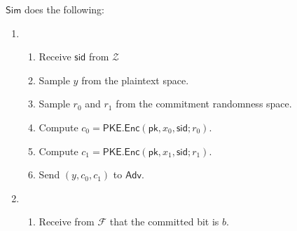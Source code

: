 \documentclass[11pt,letterpaper]{article}
\newcommand{\doclearpage}{%
  \iffull\clearpage\else\fi
}
\theoremstyle{plain} %
\theoremstyle{definition} %
\theoremstyle{remark} %
\newcommand{\Input}{x}
\newcommand{\PKE}{\mathsf{PKE}}
\newcommand{\Enc}{\mathsf{Enc}}
\newcommand{\EncKey}{\mathsf{pk}}
\newcommand{\Ciphertext}{c}
\newcommand{\Rand}{r}
\newcommand{\CFPTPOutput}{y}
\newcommand{\Simulator}{{\mathsf{Sim}}} %
\newcommand{\Adversary}{{\mathsf{Adv}}} %
\newcommand{\Environment}{{\mathcal{Z}}} %
\newcommand{\IF}{\mathcal{F}} %
\newcommand{\sid}{\mathsf{sid}}
\newcommand{\CommittedBit}{b}
\begin{document}
\begin{minipage}{0.9\textwidth}
 $\Simulator$ does the following:
\begin{enumerate}[nolistsep]
	\item {}
	\begin{enumerate}[nolistsep]
		\item Receive $\sid$ from $\Environment$
		\item Sample $\CFPTPOutput$ from the plaintext space.
		\item Sample $\Rand_{0}$ and $\Rand_{1}$ from the commitment randomness space.
		\item Compute $\Ciphertext_{0} = \PKE.\Enc(\EncKey,\Input_{0}, \sid; \Rand_{0})$.
		\item Compute $\Ciphertext_{1} = \PKE.\Enc(\EncKey,\Input_{1}, \sid; \Rand_{1})$.
		\item Send $(\CFPTPOutput, \Ciphertext_0, \Ciphertext_1)$ to $\Adversary$.
	\end{enumerate}

	\item {}

	\begin{enumerate}[nolistsep]
		\item Receive from $\IF$ that the committed bit is $\CommittedBit$.
	\end{enumerate}

\end{enumerate}
\end{minipage}

\doclearpage
{\small{


}}
\end{document}
